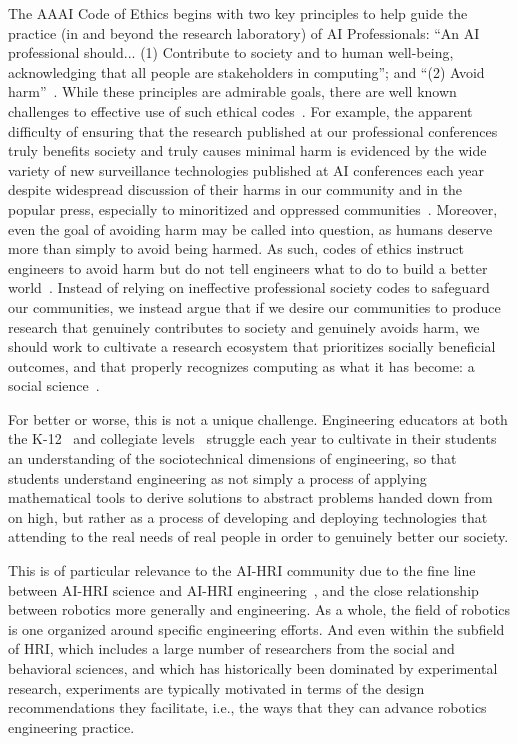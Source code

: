 \documentclass[letterpaper]{article} %
\begin{document}
The AAAI Code of Ethics begins with two key principles to help guide the practice (in and beyond the research laboratory) of AI Professionals: ``An AI professional should... (1) Contribute to society and to human well-being, acknowledging that all people are stakeholders in computing''; and ``(2) Avoid harm''~\cite{aaai2019aaai}. While these principles are admirable goals, there are well known challenges to effective use of such ethical codes~\cite{giorgini2015researcher}. 
For example, the apparent difficulty of ensuring that the research published at our professional conferences truly benefits society and truly causes minimal harm is evidenced by the wide variety of new surveillance technologies published at AI conferences each year despite widespread discussion of their harms in our community and in the popular press, especially to minoritized and oppressed communities~\cite{gebru2020race}. Moreover, even the goal of avoiding harm may be called into question, as humans deserve more than simply to avoid being harmed. As such, codes of ethics instruct engineers to avoid harm but do not tell engineers what to do to build a better world~\cite{harris2008good}.
%
Instead of relying on ineffective professional society codes to safeguard our communities, we instead argue that if we desire our communities to produce research that genuinely contributes to society and genuinely avoids harm, we should work to cultivate a research ecosystem that prioritizes socially beneficial outcomes, and that properly recognizes computing as what it has become: a social science~\cite{connolly2020computing}.

For better or worse, this is not a unique challenge. Engineering educators at both the K-12~\cite{mcgowan2020engineering} and collegiate levels~\cite{swartz2019sociotechnical} struggle each year to cultivate in their students an understanding of the sociotechnical dimensions of engineering, so that students understand engineering as not simply a process of applying mathematical tools to derive solutions to abstract problems handed down from on high, but rather as a process of developing and deploying technologies that attending to the real needs of real people in order to genuinely better our society. 

This is of particular relevance to the AI-HRI community due to the fine line between AI-HRI science and AI-HRI engineering~\cite{depalma2014quis}, and the 
close relationship between robotics more generally and engineering. As a whole, the field of robotics is one organized around specific engineering efforts. And even within the subfield of HRI, which includes a large number of researchers from the social and behavioral sciences, and which has historically been dominated by experimental research, experiments are typically motivated in terms of the design recommendations they facilitate, i.e., the ways that they can advance robotics engineering practice. 
\end{document}
